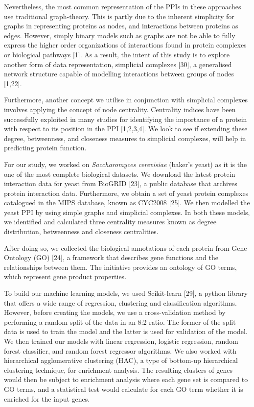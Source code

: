 \documentclass[9pt]{article}
\begin{document}
\par
Nevertheless, the most common representation of the PPIs in these approaches use traditional graph-theory. This is partly due to the inherent simplicity for graphs in representing proteins as nodes, and interactions between proteins as edges. However, simply binary models such as graphs are not be able to fully express the higher order organizations of interactions found in protein complexes or biological pathways [1]. As a result, the intent of this study is to explore another form of data representation, simplicial complexes [30], a generalised network structure capable of modelling interactions between groups of nodes [1,22]. 
\par
Furthermore, another concept we utilise in conjunction with simplicial complexes involves applying the concept of node centrality. Centrality indices have been successfully exploited in many studies for identifying the importance of a protein with respect to its position in the PPI [1,2,3,4]. We look to see if extending these degree, betweenness, and closeness measures to simplicial complexes, will help in predicting protein function.
\par
For our study, we worked on \textit{Saccharomyces cerevisiae} (baker’s yeast) as it is the one of the most complete biological datasets. We download the latest protein interaction data for yeast from BioGRID [23], a public database that archives protein interaction data. Furthermore, we obtain a set of yeast protein complexes catalogued in the MIPS database, known as CYC2008 [25]. We then modelled the yeast PPI by using simple graphs and simplicial complexes. In both these models, we identified and calculated three centrality measures known as degree distribution, betweenness and closeness centralities. 
\par
After doing so, we collected the biological annotations of each protein from Gene Ontology (GO) [24], a framework that describes gene functions and the relationships between them. The initiative provides an ontology of GO terms, which represent gene product properties.
\par
To build our machine learning models, we used Scikit-learn [29], a python library that offers a wide range of regression, clustering and classification algorithms. However, before creating the models, we use a cross-validation method by performing a random split of the data in an 8:2 ratio. The former of the split data is used to train the model and the latter is used for validation of the model. We then trained our models with linear regression, logistic regression, random forest classifier, and random forest regressor algorithms. We also worked with hierarchical agglomerative clustering (HAC), a type of bottom-up hierarchical clustering technique, for enrichment analysis. The resulting clusters of genes would then be subject to enrichment analysis where each gene set is compared to GO terms, and a statistical test would calculate for each GO term whether it is enriched for the input genes. 
\end{document}
